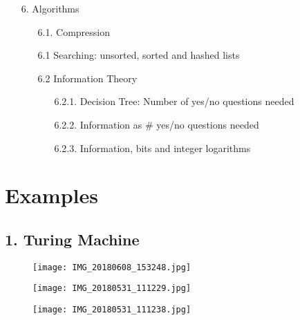 \documentclass{article}
\begin{document}
\begin{enumerate}
\begin{enumerate}
\begin{enumerate}
		\end{enumerate}
	\end{enumerate}
\item[ 6.] Algorithms
	\begin{enumerate}
	\item[6.1.] Compression
	\item[6.1] Searching: unsorted, sorted and hashed lists
	\item[6.2] Information Theory
		\begin{enumerate}
     		\item[ 6.2.1.] Decision Tree: Number of yes/no questions needed
     		\item[ 6.2.2.] Information as \# yes/no questions needed
		\item[6.2.3.] Information, bits and integer logarithms
		\end{enumerate}
	\end{enumerate}
\end{enumerate}
     
\section{Examples}
\subsection{1. Turing Machine}
\begin{figure}[H]
\texttt{[image: IMG\_20180608\_153248.jpg]}
\end{figure}
\begin{figure}[H]
\texttt{[image: IMG\_20180531\_111229.jpg]}
\end{figure}
\begin{figure}[H]
\texttt{[image: IMG\_20180531\_111238.jpg]}
\end{figure}
\end{document}
